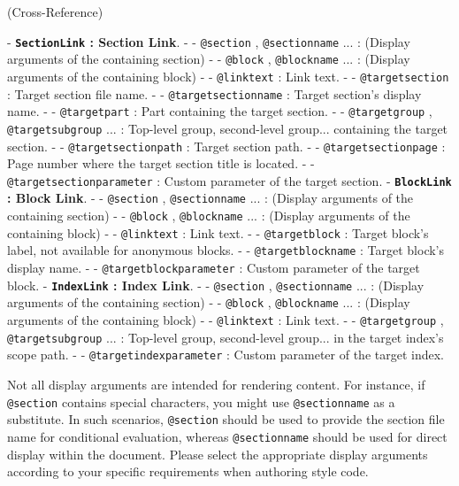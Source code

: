 (\large Cross-Reference){
    \par\medskip{}
    - \textbf{\texttt{SectionLink} : Section Link}.
        - - \texttt{@section} , \texttt{@sectionname} ... : (Display arguments of the containing section)
        - - \texttt{@block} , \texttt{@blockname} ... : (Display arguments of the containing block)
        - - \texttt{@linktext} : Link text.
        - - \texttt{@targetsection} : Target section file name.
        - - \texttt{@targetsectionname} : Target section's display name.
        - - \texttt{@targetpart} : Part containing the target section.
        - - \texttt{@targetgroup} , \texttt{@targetsubgroup} ... : Top-level group, second-level group... containing the target section.
        - - \texttt{@targetsectionpath} : Target section path.
        - - \texttt{@targetsectionpage} : Page number where the target section title is located.
        - - \texttt{@targetsectionparameter} : Custom parameter of the target section.
    \newpage{}
    - \textbf{\texttt{BlockLink} : Block Link}.
        - - \texttt{@section} , \texttt{@sectionname} ... : (Display arguments of the containing section)
        - - \texttt{@block} , \texttt{@blockname} ... : (Display arguments of the containing block)
        - - \texttt{@linktext} : Link text.
        - - \texttt{@targetblock} : Target block's label, not available for anonymous blocks.
        - - \texttt{@targetblockname} : Target block's display name.
        - - \texttt{@targetblockparameter} : Custom parameter of the target block.
    - \textbf{\texttt{IndexLink} : Index Link}.
        - - \texttt{@section} , \texttt{@sectionname} ... : (Display arguments of the containing section)
        - - \texttt{@block} , \texttt{@blockname} ... : (Display arguments of the containing block)
        - - \texttt{@linktext} : Link text.
        - - \texttt{@targetgroup} , \texttt{@targetsubgroup} ... : Top-level group, second-level group... in the target index's scope path.
        - - \texttt{@targetindexparameter} : Custom parameter of the target index.
}

Not all display arguments are intended for rendering content. For instance, if \texttt{@section} contains special characters, you might use \texttt{@sectionname} as a substitute. In such scenarios, \texttt{@section} should be used to provide the section file name for conditional evaluation, whereas \texttt{@sectionname} should be used for direct display within the document. Please select the appropriate display arguments according to your specific requirements when authoring style code.

